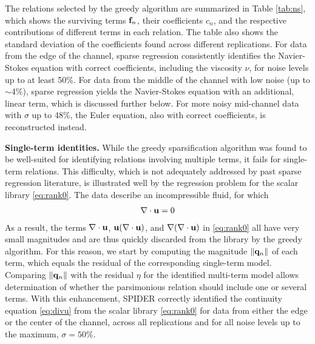 \documentclass[
 reprint,
 amsmath,amssymb,
 aps,
]{revtex4-2}
\begin{document}
The relations selected by the greedy algorithm are summarized in Table \ref{tab:ns}, which shows the surviving terms ${\bf f}_n$, their coefficients $c_n$, and the respective contributions of different terms in each relation. The table also shows the standard deviation of the coefficients found across different replications. For data from the edge of the channel, sparse regression consistently identifies the Navier-Stokes equation with correct coefficients, including the viscosity $\nu$, for noise levels up to at least 50\%. For data from the middle of the channel with low noise (up to $\sim$4\%), sparse regression yields the Navier-Stokes equation with an additional, linear term, which is discussed further below. For more noisy mid-channel data with $\sigma$ up to 48\%, the Euler equation, also with correct coefficients, is reconstructed instead.

{\bf Single-term identities.} While the greedy sparsification algorithm was found to be well-suited for identifying relations involving multiple terms, it fails for single-term relations. This difficulty, which is not adequately addressed by past sparse regression literature, is illustrated well by the regression problem for the scalar library \eqref{eq:rank0}. The data describe an incompressible fluid, for which 
\begin{align}\label{eq:divu}
    \nabla\cdot{\bf u}=0
\end{align}
As a result, the terms $\nabla\cdot{\bf u}$, ${\bf u}(\nabla\cdot{\bf u})$, and $\nabla(\nabla\cdot{\bf u})$ in \eqref{eq:rank0} all have very small magnitudes and are thus quickly discarded from the library by the greedy algorithm. 
For this reason, we start by computing the magnitude $\|{\bf q}_n\|$ of each term, which equals the residual of the corresponding single-term model. Comparing $\|{\bf q}_n\|$ with the residual $\eta$ for the identified multi-term model allows determination of whether the parsimonious relation should include one or several terms. With this enhancement, SPIDER correctly identified the continuity equation \eqref{eq:divu} from the scalar library \eqref{eq:rank0} for data from either the edge or the center of the channel, across all replications and for all noise levels up to the maximum, $\sigma = 50\%$.
\end{document}
